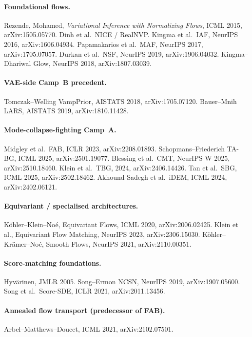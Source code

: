 \documentclass[11pt,letterpaper]{article}
\theoremstyle{plain}
\begin{document}
\paragraph{Foundational flows.} Rezende, Mohamed, \emph{Variational Inference with
Normalizing Flows}, ICML 2015, arXiv:1505.05770. Dinh et al.\ NICE / RealNVP.
Kingma et al.\ IAF, NeurIPS 2016, arXiv:1606.04934. Papamakarios et al.\ MAF,
NeurIPS 2017, arXiv:1705.07057. Durkan et al.\ NSF, NeurIPS 2019,
arXiv:1906.04032. Kingma--Dhariwal Glow, NeurIPS 2018, arXiv:1807.03039.

\paragraph{VAE-side Camp~B precedent.} Tomczak--Welling VampPrior, AISTATS 2018,
arXiv:1705.07120. Bauer--Mnih LARS, AISTATS 2019, arXiv:1810.11428.

\paragraph{Mode-collapse-fighting Camp~A.} Midgley et al.\ FAB, ICLR 2023,
arXiv:2208.01893. Schopmans--Friederich TA-BG, ICML 2025, arXiv:2501.19077.
Blessing et al.\ CMT, NeurIPS-W 2025, arXiv:2510.18460. Klein et al.\ TBG, 2024,
arXiv:2406.14426. Tan et al.\ SBG, ICML 2025, arXiv:2502.18462. Akhound-Sadegh
et al.\ iDEM, ICML 2024, arXiv:2402.06121.

\paragraph{Equivariant / specialised architectures.} Köhler--Klein--Noé,
Equivariant Flows, ICML 2020, arXiv:2006.02425. Klein et al., Equivariant Flow
Matching, NeurIPS 2023, arXiv:2306.15030. Köhler--Krämer--Noé, Smooth Flows,
NeurIPS 2021, arXiv:2110.00351.

\paragraph{Score-matching foundations.} Hyvärinen, JMLR 2005. Song--Ermon NCSN,
NeurIPS 2019, arXiv:1907.05600. Song et al.\ Score-SDE, ICLR 2021, arXiv:2011.13456.

\paragraph{Annealed flow transport (predecessor of FAB).} Arbel--Matthews--Doucet,
ICML 2021, arXiv:2102.07501.
\end{document}
